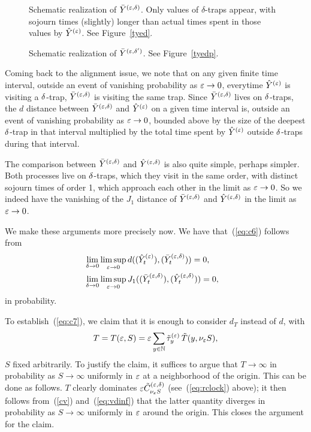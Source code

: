 \begin{figure}[htb]
\begin{center}

\end{center}
\caption{Schematic realization of $\bar Y^{(\varepsilon,\delta)}$. Only values of $\delta$-traps appear, with sojourn times (slightly) longer than
actual times spent in those values by $\hat Y^{(\varepsilon)}$. See Figure~\ref{tyed}.}
\label{byed}
\end{figure}


\begin{figure}[htb]
\begin{center}

\end{center}
\caption{Schematic realization of $\bar Y^{(\varepsilon,\delta')}$. See Figure~\ref{tyedp}.}
\label{byedp}
\end{figure}

Coming back to the alignment issue, we note that on any given finite time interval, outside an event of vanishing 
probability as $\varepsilon\to0$,
everytime $\hat Y^{(\varepsilon)}$ is visiting a $\delta$-trap, $\bar Y^{(\varepsilon,\delta)}$ is visiting the same trap. Since $\bar Y^{(\varepsilon,\delta)}$ lives on
$\delta$-traps, the $d$ distance between $\bar Y^{(\varepsilon,\delta)}$ and $\hat Y^{(\varepsilon)}$ on a given time interval is, outside an event of vanishing 
probability as $\varepsilon\to0$, bounded above by the size of the deepest $\delta$-trap in that interval multiplied by the total 
time spent by $\hat Y^{(\varepsilon)}$ outside $\delta$-traps during that interval.

The comparison between $\bar Y^{(\varepsilon,\delta)}$ and $\hat Y^{(\varepsilon,\delta)}$ is also quite simple, perhaps simpler. Both processes live on $\delta$-traps, which 
they visit in the same order, with distinct sojourn times of order 1, which approach each other in the limit as $\varepsilon\to0$. 
So we indeed have the vanishing of the $J_1$ distance of $\bar Y^{(\varepsilon,\delta)}$ and $\hat Y^{(\varepsilon,\delta)}$ in the limit as $\varepsilon\to0$.

We make these arguments more precisely now. We have that~(\ref{eq:c6}) follows from
\begin{eqnarray}
\label{eq:c7}
&\lim_{\delta\to0}\limsup_{\eps\to0}d((\hye_t),(\vyed_t))=0,&\\
\label{eq:c8}
&\lim_{\delta\to0}\limsup_{\eps\to0}J_1((\vyed_t),(\byed_t))=0,&
\end{eqnarray}
in probability.



To establish~(\ref{eq:c7}),  we claim that it is enough to consider $d_T$ instead of $d$, with
\begin{equation}
\label{eq:N}
T=T(\eps,S)=\eps\sum_{y\in\N} \tilde\tau_{y}^{(\eps)}\,\tilde T(y,\nu_\eps S),
\end{equation}
$S$ fixed arbitrarily.  To justify the claim, it suffices to argue that $T\to\infty$ in probability as $S\to\infty$ 
uniformly in $\varepsilon$ at a
neighborhood of the origin. This can be done as follows. $T$ clearly dominates $\varepsilon\tilde C^{(\varepsilon,\delta)}_{\nu_\varepsilon S}$ 
(see~(\ref{eq:rclock}) above); it then follows
from~(\ref{cv}) and~(\ref{eq:vdinf}) that
the latter quantity diverges in probability as $S\to\infty$ uniformly in $\varepsilon$ around the origin. 
This closes the argument for the claim. 

